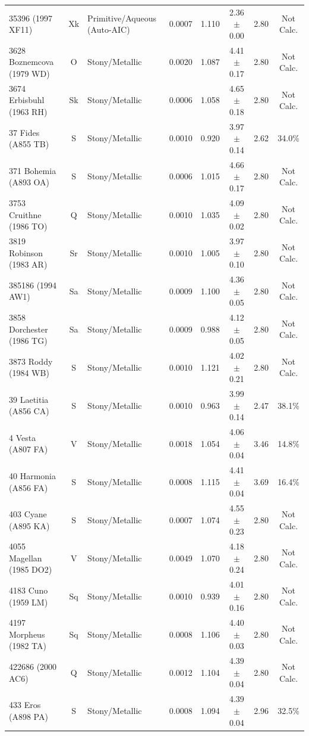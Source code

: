 {\begin{longtable}{p{2.6cm} c p{2.2cm} c c c c c}
35396 (1997 XF11) & Xk & Primitive/Aqueous (Auto-AIC) & 0.0007 & 1.110 & 2.36 $\pm$ 0.00 & 2.80 & Not Calc. \\
3628 Boznemcova (1979 WD) & O & Stony/Metallic & 0.0020 & 1.087 & 4.41 $\pm$ 0.17 & 2.80 & Not Calc. \\
3674 Erbisbuhl (1963 RH) & Sk & Stony/Metallic & 0.0006 & 1.058 & 4.65 $\pm$ 0.18 & 2.80 & Not Calc. \\
37 Fides (A855 TB) & S & Stony/Metallic & 0.0010 & 0.920 & 3.97 $\pm$ 0.14 & 2.62 & 34.0\% \\
371 Bohemia (A893 OA) & S & Stony/Metallic & 0.0006 & 1.015 & 4.66 $\pm$ 0.17 & 2.80 & Not Calc. \\
3753 Cruithne (1986 TO) & Q & Stony/Metallic & 0.0010 & 1.035 & 4.09 $\pm$ 0.02 & 2.80 & Not Calc. \\
3819 Robinson (1983 AR) & Sr & Stony/Metallic & 0.0010 & 1.005 & 3.97 $\pm$ 0.10 & 2.80 & Not Calc. \\
385186 (1994 AW1) & Sa & Stony/Metallic & 0.0009 & 1.100 & 4.36 $\pm$ 0.05 & 2.80 & Not Calc. \\
3858 Dorchester (1986 TG) & Sa & Stony/Metallic & 0.0009 & 0.988 & 4.12 $\pm$ 0.05 & 2.80 & Not Calc. \\
3873 Roddy (1984 WB) & S & Stony/Metallic & 0.0010 & 1.121 & 4.02 $\pm$ 0.21 & 2.80 & Not Calc. \\
39 Laetitia (A856 CA) & S & Stony/Metallic & 0.0010 & 0.963 & 3.99 $\pm$ 0.14 & 2.47 & 38.1\% \\
4 Vesta (A807 FA) & V & Stony/Metallic & 0.0018 & 1.054 & 4.06 $\pm$ 0.04 & 3.46 & 14.8\% \\
40 Harmonia (A856 FA) & S & Stony/Metallic & 0.0008 & 1.115 & 4.41 $\pm$ 0.04 & 3.69 & 16.4\% \\
403 Cyane (A895 KA) & S & Stony/Metallic & 0.0007 & 1.074 & 4.55 $\pm$ 0.23 & 2.80 & Not Calc. \\
4055 Magellan (1985 DO2) & V & Stony/Metallic & 0.0049 & 1.070 & 4.18 $\pm$ 0.24 & 2.80 & Not Calc. \\
4183 Cuno (1959 LM) & Sq & Stony/Metallic & 0.0010 & 0.939 & 4.01 $\pm$ 0.16 & 2.80 & Not Calc. \\
4197 Morpheus (1982 TA) & Sq & Stony/Metallic & 0.0008 & 1.106 & 4.40 $\pm$ 0.03 & 2.80 & Not Calc. \\
422686 (2000 AC6) & Q & Stony/Metallic & 0.0012 & 1.104 & 4.39 $\pm$ 0.04 & 2.80 & Not Calc. \\
433 Eros (A898 PA) & S & Stony/Metallic & 0.0008 & 1.094 & 4.39 $\pm$ 0.04 & 2.96 & 32.5\% \\

\end{longtable}}

